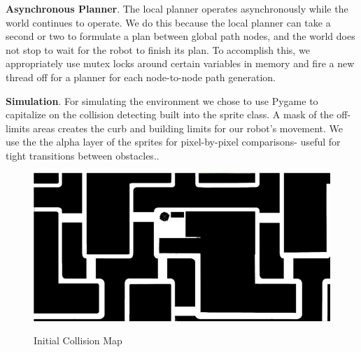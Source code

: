 \documentclass{article}
\begin{document}
\begin{multicols}{2}
\noindent \textbf{Asynchronous Planner}. The local planner operates asynchronously while the world continues to operate. We do this because the local planner can take a second or two to formulate a plan between global path nodes, and the world does not stop to wait for the robot to finish its plan. To accomplish this, we appropriately use mutex locks around certain variables in memory and fire a new thread off for a planner for each node-to-node path generation.

\noindent \textbf{Simulation}. For simulating the environment we chose to use Pygame to capitalize on the collision detecting built into the sprite class.  A mask of the off-limits areas creates the curb and building limits for our robot's movement. We use the the alpha layer of the sprites for pixel-by-pixel comparisons- useful for tight transitions between obstacles..\
\begin{figure}[H]
   \centering
    \includegraphics[width = 1\columnwidth]{figures/mask.png}
     \label{fig:mask}
     \caption{Initial Collision Map}
\end{figure}


\end{multicols}
\end{document}
